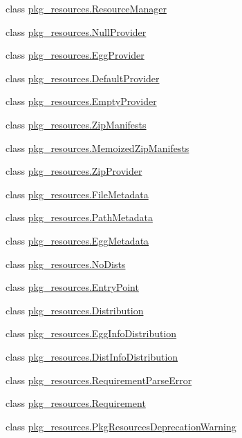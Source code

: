 \begin{DoxyCompactItemize}
\item 
class \hyperlink{classpkg__resources_1_1ResourceManager}{pkg\+\_\+resources.\+Resource\+Manager}
\item 
class \hyperlink{classpkg__resources_1_1NullProvider}{pkg\+\_\+resources.\+Null\+Provider}
\item 
class \hyperlink{classpkg__resources_1_1EggProvider}{pkg\+\_\+resources.\+Egg\+Provider}
\item 
class \hyperlink{classpkg__resources_1_1DefaultProvider}{pkg\+\_\+resources.\+Default\+Provider}
\item 
class \hyperlink{classpkg__resources_1_1EmptyProvider}{pkg\+\_\+resources.\+Empty\+Provider}
\item 
class \hyperlink{classpkg__resources_1_1ZipManifests}{pkg\+\_\+resources.\+Zip\+Manifests}
\item 
class \hyperlink{classpkg__resources_1_1MemoizedZipManifests}{pkg\+\_\+resources.\+Memoized\+Zip\+Manifests}
\item 
class \hyperlink{classpkg__resources_1_1ZipProvider}{pkg\+\_\+resources.\+Zip\+Provider}
\item 
class \hyperlink{classpkg__resources_1_1FileMetadata}{pkg\+\_\+resources.\+File\+Metadata}
\item 
class \hyperlink{classpkg__resources_1_1PathMetadata}{pkg\+\_\+resources.\+Path\+Metadata}
\item 
class \hyperlink{classpkg__resources_1_1EggMetadata}{pkg\+\_\+resources.\+Egg\+Metadata}
\item 
class \hyperlink{classpkg__resources_1_1NoDists}{pkg\+\_\+resources.\+No\+Dists}
\item 
class \hyperlink{classpkg__resources_1_1EntryPoint}{pkg\+\_\+resources.\+Entry\+Point}
\item 
class \hyperlink{classpkg__resources_1_1Distribution}{pkg\+\_\+resources.\+Distribution}
\item 
class \hyperlink{classpkg__resources_1_1EggInfoDistribution}{pkg\+\_\+resources.\+Egg\+Info\+Distribution}
\item 
class \hyperlink{classpkg__resources_1_1DistInfoDistribution}{pkg\+\_\+resources.\+Dist\+Info\+Distribution}
\item 
class \hyperlink{classpkg__resources_1_1RequirementParseError}{pkg\+\_\+resources.\+Requirement\+Parse\+Error}
\item 
class \hyperlink{classpkg__resources_1_1Requirement}{pkg\+\_\+resources.\+Requirement}
\item 
class \hyperlink{classpkg__resources_1_1PkgResourcesDeprecationWarning}{pkg\+\_\+resources.\+Pkg\+Resources\+Deprecation\+Warning}
\end{DoxyCompactItemize}
